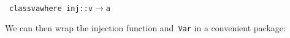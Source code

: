 \documentclass[9pt,authoryear]{sigplanconf}
\begin{document}
{\nopagebreak }

%
%
%
~\\~\vphantom{$\{$}\texttt{class}\texttt{\mbox{\hspace{0.50em}}}\texttt{v}\texttt{\mbox{\hspace{0.50em}}}\texttt{\makebox[1.22ex][c]{$ \in $}}\texttt{\mbox{\hspace{0.50em}}}\texttt{a}\texttt{\mbox{\hspace{0.50em}}}\texttt{where}\texttt{{\nopagebreak \newline%
}\vphantom{$\{$}}\texttt{\mbox{\hspace{0.50em}}}\texttt{\mbox{\hspace{0.50em}}}\texttt{inj}\texttt{\mbox{\hspace{0.50em}}}\texttt{{:}{:}}\texttt{\mbox{\hspace{0.50em}}}\texttt{v}\texttt{\mbox{\hspace{0.50em}}}\texttt{$ \rightarrow $}\texttt{\mbox{\hspace{0.50em}}}\texttt{a}\texttt{{\nopagebreak \newline%
}\vphantom{$\{$}}%


%
We can then wrap the injection function and{~}\texttt{Var} in a convenient
    package{:}%


%
%


{\nopagebreak }
\end{document}
